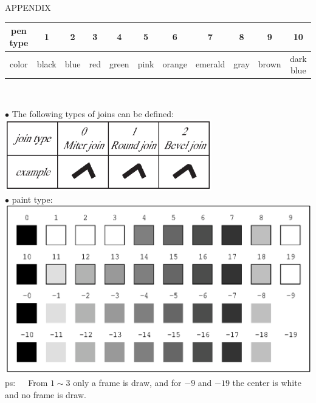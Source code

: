 \begin{qsection}{APPENDIX}
\begin{center}
\begin{tabular}{|c|c|c|c|c|c|c|c|c|c|c|}
 \hline
 pen type& 1& 2& 3& 4& 5& 6& 7& 8& 9&10  \\ \hline
 color   & black& blue& red& green& pink& orange& emerald& gray&brown & 
 dark blue \\ \hline
\end{tabular}\\
\end{center}

\vspace{5mm}
\hypertarget{join-type}{}
{\large \hspace{-1.5ex}$\bullet$ 
The following types of joins can be defined:}\\
\includegraphics[width=9cm]{fig/join-type.eps}\\

\vspace{5mm}
{\large \hspace{-1.5ex}$\bullet$ paint type:}\\
\includegraphics{fig/paint.eps}\\
ps:~~~From $1 \sim 3$ only a frame is draw,
and for $-9$ and $-19$ the center is white and no frame is draw.

\end{qsection}
